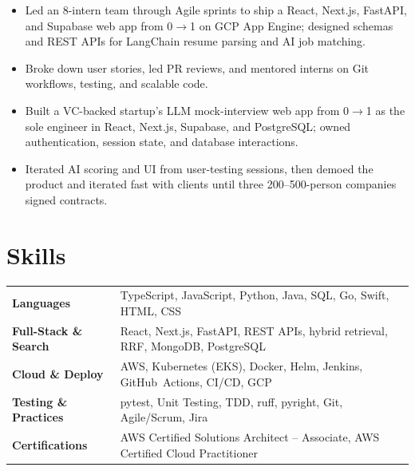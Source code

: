 \documentclass[11pt, letterpaper]{article}
\begin{document}
\vspace{1pt}
\begin{itemize}
  \item Led an 8-intern team through Agile sprints to ship a React, Next.js, FastAPI, and Supabase web app from 0$\to$1 on GCP App Engine; designed schemas and REST APIs for LangChain resume parsing and AI job matching.
  \item Broke down user stories, led PR reviews, and mentored interns on Git workflows, testing, and scalable code.
\end{itemize}

\vspace{1pt}
\begin{itemize}
  \item Built a VC-backed startup's LLM mock-interview web app from 0$\to$1 as the sole engineer in React, Next.js, Supabase, and PostgreSQL; owned authentication, session state, and database interactions.
  \item Iterated AI scoring and UI from user-testing sessions, then demoed the product and iterated fast with clients until three 200--500-person companies signed contracts.
\end{itemize}

\section{Skills}
\begin{tabularx}{\textwidth}{@{}l @{\hspace{7pt}} >{\raggedright\arraybackslash}X@{}}
  \textbf{Languages} & TypeScript, JavaScript, Python, Java, SQL, Go, Swift, HTML, CSS \\[1pt]
  \textbf{Full-Stack \& Search} & React, Next.js, FastAPI, REST APIs, hybrid retrieval, RRF, MongoDB, PostgreSQL \\[1pt]
  \textbf{Cloud \& Deploy} & AWS, Kubernetes (EKS), Docker, Helm, Jenkins, GitHub~Actions, CI/CD, GCP \\[1pt]
  \textbf{Testing \& Practices} & pytest, Unit Testing, TDD, ruff, pyright, Git, Agile/Scrum, Jira \\[1pt]
  \textbf{Certifications} & AWS Certified Solutions Architect -- Associate, AWS Certified Cloud Practitioner \\
\end{tabularx}
\end{document}
